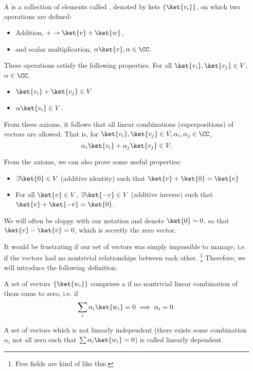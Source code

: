 \begin{defn}
    A  is a collection of elements called , denoted by kets $\set{\ket{v_i}}$, on which two operations are defined: 
    \begin{itemize}
        \item Addition, $+\to \ket{v}+\ket{w}$,
        \item and scalar multiplication, $\alpha \ket{v}, \alpha \in \CC.$
    \end{itemize} 
    These operations satisfy the following properties. For all $\ket{v_i},\ket{v_j}\in V$, $\alpha\in \CC$,
    \begin{itemize}
        \item $\ket{v_i}+\ket{v_j}\in V$
        \item $\alpha\ket{v_i} \in V$.
    \end{itemize}
\end{defn}

From these axioms, it follows that all linear combinations (superpositions) of vectors are allowed. That is, for $\ket{v_i},\ket{v_j}\in V, \alpha_i,\alpha_j\in \CC$,
\begin{equation}
    \alpha_i \ket{v_i} +\alpha_j \ket{v_j}\in V.
\end{equation}

From the axioms, we can also prove some useful properties:
\begin{itemize}
    \item $\exists \ket{0}\in V$ (additive identity) such that $\ket{v}+\ket{0}=\ket{v}$
    \item For all $\ket{v}\in V$, $\exists \ket{-v} \in V$ (additive inverse) such that $\ket{v}+\ket{-v}=\ket{0}$.
\end{itemize}
We will often be sloppy with our notation and denote $\ket{0}\sim 0$, so that $\ket{v}-\ket{v}=0$, which is secretly the zero vector.

It would be frustrating if our set of vectors was simply impossible to manage, i.e. if the vectors had no nontrivial relationships between each other.%
    \footnote{Free fields are kind of like this.}
Therefore, we will introduce the following definition.
\begin{defn}
    A set of vectors $\set{\ket{w_i}}$ comprises a  if no nontrivial linear combination of them sums to zero, i.e. if
    \begin{equation}
        \sum_i \alpha_i \ket{w_i} =0 \implies \alpha_i = 0.
    \end{equation}
\end{defn}
\begin{defn}
    A set of vectors which is not linearly independent (there exists some combination $\alpha_i$ not all zero such that $\sum \alpha_i \ket{w_i}=0$) is called linearly dependent.
\end{defn}

